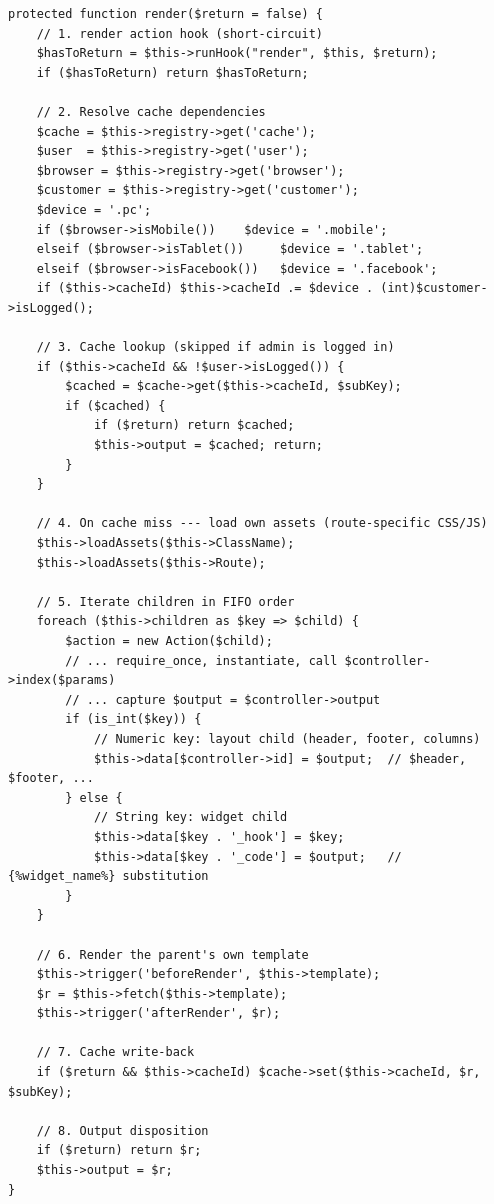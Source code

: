 \documentclass[11pt,a4paper]{article}
\begin{document}
\begin{lstlisting}[caption={\texttt{Controller::render()} --- the 8-step algorithm (abridged).},label={lst:render}]
protected function render($return = false) {
    // 1. render action hook (short-circuit)
    $hasToReturn = $this->runHook("render", $this, $return);
    if ($hasToReturn) return $hasToReturn;

    // 2. Resolve cache dependencies
    $cache = $this->registry->get('cache');
    $user  = $this->registry->get('user');
    $browser = $this->registry->get('browser');
    $customer = $this->registry->get('customer');
    $device = '.pc';
    if ($browser->isMobile())    $device = '.mobile';
    elseif ($browser->isTablet())     $device = '.tablet';
    elseif ($browser->isFacebook())   $device = '.facebook';
    if ($this->cacheId) $this->cacheId .= $device . (int)$customer->isLogged();

    // 3. Cache lookup (skipped if admin is logged in)
    if ($this->cacheId && !$user->isLogged()) {
        $cached = $cache->get($this->cacheId, $subKey);
        if ($cached) {
            if ($return) return $cached;
            $this->output = $cached; return;
        }
    }

    // 4. On cache miss --- load own assets (route-specific CSS/JS)
    $this->loadAssets($this->ClassName);
    $this->loadAssets($this->Route);

    // 5. Iterate children in FIFO order
    foreach ($this->children as $key => $child) {
        $action = new Action($child);
        // ... require_once, instantiate, call $controller->index($params)
        // ... capture $output = $controller->output
        if (is_int($key)) {
            // Numeric key: layout child (header, footer, columns)
            $this->data[$controller->id] = $output;  // $header, $footer, ...
        } else {
            // String key: widget child
            $this->data[$key . '_hook'] = $key;
            $this->data[$key . '_code'] = $output;   // {%widget_name%} substitution
        }
    }

    // 6. Render the parent's own template
    $this->trigger('beforeRender', $this->template);
    $r = $this->fetch($this->template);
    $this->trigger('afterRender', $r);

    // 7. Cache write-back
    if ($return && $this->cacheId) $cache->set($this->cacheId, $r, $subKey);

    // 8. Output disposition
    if ($return) return $r;
    $this->output = $r;
}
\end{lstlisting}
\end{document}
